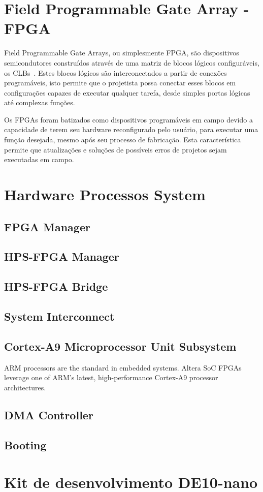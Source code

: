 
\section{Field Programmable Gate Array - FPGA}
Field Programmable Gate Arrays, ou simplesmente FPGA, são dispositivos semicondutores construídos através de uma matriz de blocos lógicos configuráveis, os CLBs~\cite{FPGAXilinx}. Estes blocos lógicos são interconectados a partir de conexões programáveis, isto permite que o projetista possa conectar esses blocos em configurações capazes de executar qualquer tarefa, desde simples portas lógicas até complexas funções.

Os FPGAs foram batizados como dispositivos programáveis em campo devido a capacidade de terem seu hardware reconfigurado pelo usuário, para executar uma função desejada, mesmo após seu processo de fabricação. Esta característica permite que atualizações e soluções de possíveis erros de projetos sejam executadas em campo. 


\section{Hardware Processos System}
\subsection{FPGA Manager}
\subsection{HPS-FPGA Manager}
\subsection{HPS-FPGA Bridge}
\subsection{System Interconnect}
\subsection{Cortex-A9 Microprocessor Unit Subsystem}
ARM processors are the standard in embedded systems. Altera SoC FPGAs leverage one of ARM's latest, high-performance Cortex-A9 processor architectures.
\subsection{DMA Controller }
\subsection{Booting}


\section{Kit de desenvolvimento DE10-nano}